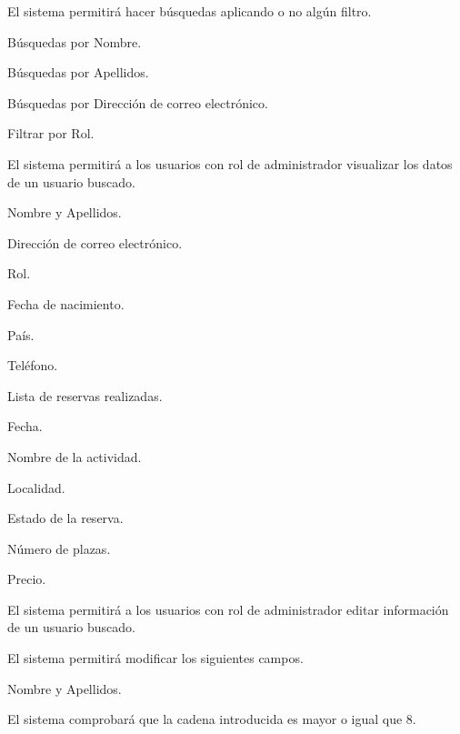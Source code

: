 \begin{enumitem}[label=\bfseries{RAdm \arabic*.},leftmargin=*]
\begin{enumitem}[label*=\bfseries{\arabic*.}]
		\item El sistema permitirá hacer búsquedas aplicando o no algún filtro.
		\begin{enumitem}[label*=\bfseries{\arabic*.}]
			\item Búsquedas por Nombre.
			\item Búsquedas por Apellidos.
			\item Búsquedas por Dirección de correo electrónico.
			\item Filtrar por Rol.
		\end{enumitem}
	\end{enumitem}
	\item El sistema permitirá a los usuarios con rol de administrador visualizar los datos de un usuario buscado.
	\begin{enumitem}[label*=\bfseries{\arabic*.}]
		\item Nombre y Apellidos.
		\item Dirección de correo electrónico.
		\item Rol.
		\item Fecha de nacimiento.
		\item País.
		\item Teléfono.
		\item Lista de reservas realizadas.
		\begin{enumitem}[label*=\bfseries{\arabic*.}]
			\item Fecha.
			\item Nombre de la actividad.
			\item Localidad.
			\item Estado de la reserva.
			\item Número de plazas.
			\item Precio.
		\end{enumitem}
	\end{enumitem}
	\item El sistema permitirá a los usuarios con rol de administrador editar información de un usuario buscado.
	\begin{enumitem}[label*=\bfseries{\arabic*.}]
		\item El sistema permitirá modificar los siguientes campos.
		\begin{enumitem}[label*=\bfseries{\arabic*.}]
			\item Nombre y Apellidos.
			\begin{enumitem}[label*=\bfseries{\arabic*.}]
				\item El sistema comprobará que la cadena introducida es mayor o igual que 8.

\end{enumitem}
\end{enumitem}
\end{enumitem}
\end{enumitem}
